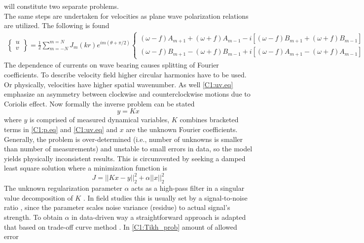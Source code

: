 \documentclass[12pt]{article}
\begin{document}
will constitute two separate problems.\\
The same steps are undertaken for velocities as plane wave polarization relations 
\citep[e.g.,][]{muller2000scattering} are utilized. The following is found
\begin{align}
\label{C1:uv.eq}
\begin{Bmatrix}
u \\ v
\end{Bmatrix}
= \frac{1}{2} \sum_{m = -N}^{m = N} J_{m} (kr) e^{im(\theta + \pi/2)}
\begin{Bmatrix}
(\omega - f) A_{m + 1} + (\omega + f) A_{m - 1} - i [(\omega - f) B_{m + 1} + (\omega + f) B_{m - 
	1}] \\ 
(\omega - f) B_{m + 1} - (\omega + f) B_{m - 1} + i [ (\omega - f) A_{m + 1} - (\omega + f) A_{m - 
	1}]
\end{Bmatrix}
\end{align}
The dependence of currents on wave bearing causes splitting of Fourier coefficients. To describe 
velocity field higher circular harmonics have to be used. Or physically, velocities have higher 
spatial wavenumber. As well \eqref{C1:uv.eq} emphasize an asymmetry between clockwise 
and counterclockwise motions due to Coriolis effect. Now formally the inverse problem can be stated 
\begin{equation}
y = K x
\end{equation}
where $y$ is comprised of measured dynamical variables, $K$ combines bracketed terms in 
\eqref{C1:p.eq} and \eqref{C1:uv.eq} and $x$ are the unknown Fourier coefficients. Generally, the 
problem is over-determined (i.e., number of unknowns is smaller than number of 
measurements) and unstable to small errors in data, so the model yields physically inconsistent 
results. This is circumvented by seeking a damped least square solution \citep{munk2009ocean} where 
a minimization function is 
\begin{equation}
\label{C1:Tikh_prob}
J = ||K x - y||^2_2 + \alpha ||x||^2_2
\end{equation}
The unknown regularization parameter $\alpha$ acts as a high-pass filter in a singular value 
decomposition of $K$ \citep{bennett1992inverse}. In field studies this is usually set by a 
signal-to-noise ratio \citep{munk2009ocean}, since the parameter scales noise variance (residue) 
to actual signal's strength. To obtain $\alpha$ in data-driven way a straightforward approach is 
adapted that based on 
trade-off curve method \citep{hansen1993use}. In \eqref{C1:Tikh_prob} amount of allowed error 
\end{document}

